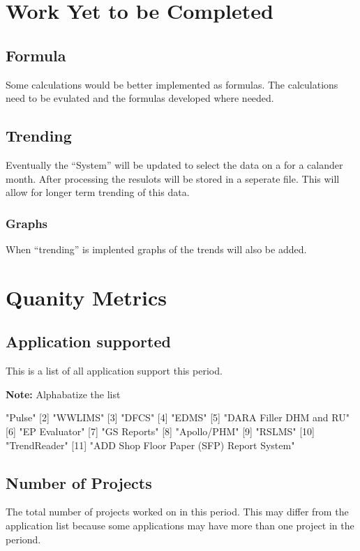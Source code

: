 \documentclass{article}
\begin{document}
\section{Work Yet to be Completed}
\subsection{Formula}
Some calculations would be better implemented as formulas. The calculations need
to be evulated and the formulas developed where needed.
\subsection{Trending}
Eventually the ``System'' will be updated to select the data on a for a calander
month. After processing the resulots will be stored in a seperate file.
This will allow for longer term trending of this data.
\subsubsection{Graphs}
When ``trending'' is implented graphs of the trends will also be added.


\section{Quanity Metrics}
\subsection{Application supported}
This is a list of all application support this period.

\textbf{Note:} Alphabatize the list

\begin{Schunk}
\begin{Soutput}
 [1] "Pulse"                                   
 [2] "WWLIMS"                                  
 [3] "DFCS"                                    
 [4] "EDMS"                                    
 [5] "DARA Filler DHM and RU"                  
 [6] "EP Evaluator"                            
 [7] "GS Reports"                              
 [8] "Apollo/PHM"                              
 [9] "RSLMS"                                   
[10] "TrendReader"                             
[11] "ADD Shop Floor Paper (SFP) Report System"
\end{Soutput}
\end{Schunk}

\subsection{Number of Projects}
The total number of  projects worked on in this period. This may differ from the
application list because some applications may have more than one project in
the periond.
\end{document}
